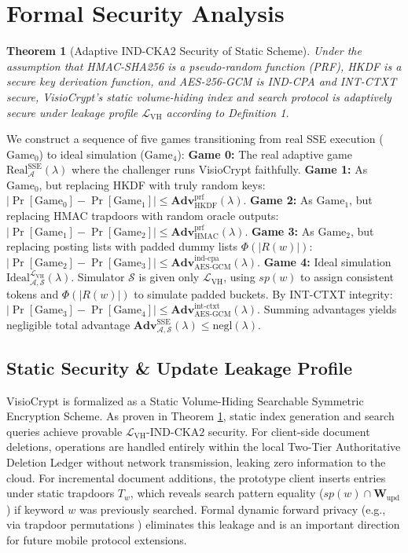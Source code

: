 \documentclass[10pt,conference]{IEEEtran}
\newtheorem{theorem}{Theorem}
\begin{document}
\section{Formal Security Analysis}
\begin{theorem}[Adaptive IND-CKA2 Security of Static Scheme]
\label{thm:security}
Under the assumption that HMAC-SHA256 is a pseudo-random function (PRF), HKDF is a secure key derivation function, and AES-256-GCM is IND-CPA and INT-CTXT secure, VisioCrypt's static volume-hiding index and search protocol is adaptively secure under leakage profile $\mathcal{L}_{\text{VH}}$ according to Definition 1.
\end{theorem}

\begin{IEEEproof}
We construct a sequence of five games transitioning from real SSE execution ($\text{Game}_0$) to ideal simulation ($\text{Game}_4$):
\textbf{Game 0:} The real adaptive game $\text{Real}_{\mathcal{A}}^{\text{SSE}}(\lambda)$ where the challenger runs VisioCrypt faithfully.
\textbf{Game 1:} As $\text{Game}_0$, but replacing HKDF with truly random keys: $|\Pr[\text{Game}_0] - \Pr[\text{Game}_1]| \le \mathbf{Adv}_{\text{HKDF}}^{\text{prf}}(\lambda)$.
\textbf{Game 2:} As $\text{Game}_1$, but replacing HMAC trapdoors with random oracle outputs: $|\Pr[\text{Game}_1] - \Pr[\text{Game}_2]| \le \mathbf{Adv}_{\text{HMAC}}^{\text{prf}}(\lambda)$.
\textbf{Game 3:} As $\text{Game}_2$, but replacing posting lists with padded dummy lists $\Phi(|R(w)|)$: $|\Pr[\text{Game}_2] - \Pr[\text{Game}_3]| \le \mathbf{Adv}_{\text{AES-GCM}}^{\text{ind-cpa}}(\lambda)$.
\textbf{Game 4:} Ideal simulation $\text{Ideal}_{\mathcal{A},\mathcal{S}}^{\mathcal{L}_{\text{VH}}}(\lambda)$. Simulator $\mathcal{S}$ is given only $\mathcal{L}_{\text{VH}}$, using $sp(w)$ to assign consistent tokens and $\Phi(|R(w)|)$ to simulate padded buckets. By INT-CTXT integrity: $|\Pr[\text{Game}_3] - \Pr[\text{Game}_4]| \le \mathbf{Adv}_{\text{AES-GCM}}^{\text{int-ctxt}}(\lambda)$.
Summing advantages yields negligible total advantage $\mathbf{Adv}_{\mathcal{A},\mathcal{S}}^{\text{SSE}}(\lambda) \le \text{negl}(\lambda)$.
\end{IEEEproof}

\subsection{Static Security \& Update Leakage Profile}
VisioCrypt is formalized as a Static Volume-Hiding Searchable Symmetric Encryption Scheme. As proven in Theorem \ref{thm:security}, static index generation and search queries achieve provable $\mathcal{L}_{\text{VH}}\text{-IND-CKA2}$ security. For client-side document deletions, operations are handled entirely within the local Two-Tier Authoritative Deletion Ledger without network transmission, leaking zero information to the cloud. For incremental document additions, the prototype client inserts entries under static trapdoors $T_w$, which reveals search pattern equality ($sp(w) \cap \mathbf{W}_{\text{upd}}$) if keyword $w$ was previously searched. Formal dynamic forward privacy (e.g., via trapdoor permutations \cite{bost2016sophos}) eliminates this leakage and is an important direction for future mobile protocol extensions.
\end{document}
